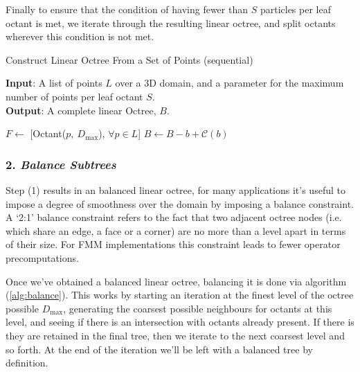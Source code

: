 \documentclass[12pt, a4, twoside]{article}
\begin{document}
 Finally to ensure that the condition of having fewer than $S$ particles per leaf octant is met, we iterate through the resulting linear octree, and split octants wherever this condition is not met.

 \begin{algorithm}
    \caption{Construct Linear Octree From a Set of Points (sequential)}\label{alg:points2octree}
    \hspace*{\algorithmicindent} \textbf{Input}: A list of points $L$ over a 3D domain, and a parameter for the maximum number of points per leaf octant $S$. \\
    \hspace*{\algorithmicindent} \textbf{Output}: A complete linear Octree, $B$.
    \begin{algorithmic}[1]
    \State $F \gets$ [Octant($p, \> D_{\max}$), $\forall p \in L$]
            \State $B \gets B - b + \mathcal{C}(b)$
        \EndIf
    \EndFor
    \EndFunction
    \end{algorithmic}
 \end{algorithm}

\subsubsection*{2. \textit{Balance Subtrees}}

Step (1) results in an balanced linear octree, for many applications it's useful to impose a degree of smoothness over the domain by imposing a balance constraint. A `2:1' balance constraint refers to the fact that two adjacent octree nodes (i.e. which share an edge, a face or a corner) are no more than a level apart in terms of their size. For FMM implementations this constraint leads to fewer operator precomputations.

Once we've obtained a balanced linear octree, balancing it is done via algorithm (\ref{alg:balance}). This works by starting an iteration at the finest level of the octree possible $D_{\max}$, generating the coarsest possible neighbours for octants at this level, and seeing if there is an intersection with octants already present. If there is they are retained in the final tree, then we iterate to the next coarsest level and so forth. At the end of the iteration we'll be left with a balanced tree by definition.
\end{document}
